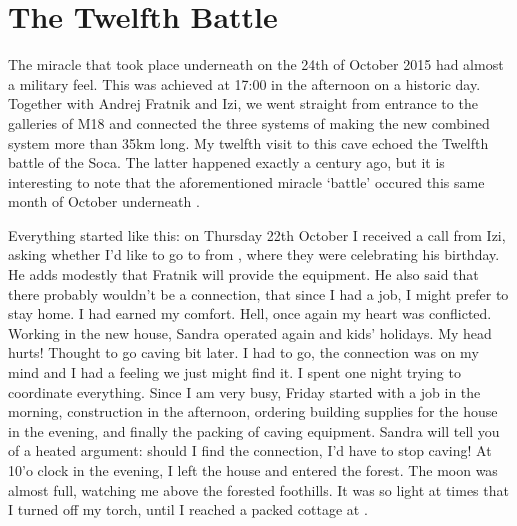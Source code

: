 

\section{The Twelfth Battle}

The miracle that took place underneath  on the 24th of October 2015 had almost a military feel. This was achieved at 17:00 in the afternoon on a historic day. Together with Andrej Fratnik and Izi, we went straight from  entrance to the galleries of M18 and connected the three systems of  making the new combined system more than 35km long. My twelfth visit to this cave echoed the Twelfth battle of the Soca. The latter happened exactly a century ago, but it is interesting to note that the aforementioned miracle `battle' occured this same month of October underneath .   



Everything started like this: on Thursday 22th October I received a call from Izi, asking whether I'd like to go to  from , where they were celebrating his birthday. He adds modestly that Fratnik will provide the equipment. He also said that there probably wouldn't be a connection, that since I had a job, I might prefer to stay home. I had earned my comfort. Hell, once again my heart was conflicted. Working in the new house, Sandra operated again and kids' holidays. My head hurts! Thought to go caving bit later.  I had to go, the connection was on my mind and I had a feeling we just might find it. I spent one night trying to coordinate everything. Since I am very busy, Friday started with a job in the morning,  construction in the afternoon, ordering building supplies for the house in the evening, and finally the packing of caving equipment. Sandra will tell you of a heated argument: should I find the connection, I'd have to stop caving!  At 10'o clock in the evening, I left the house and entered the forest.  The moon was almost full, watching me above the forested foothills. It was so light at times that I turned off my torch, until I reached a packed cottage at .

